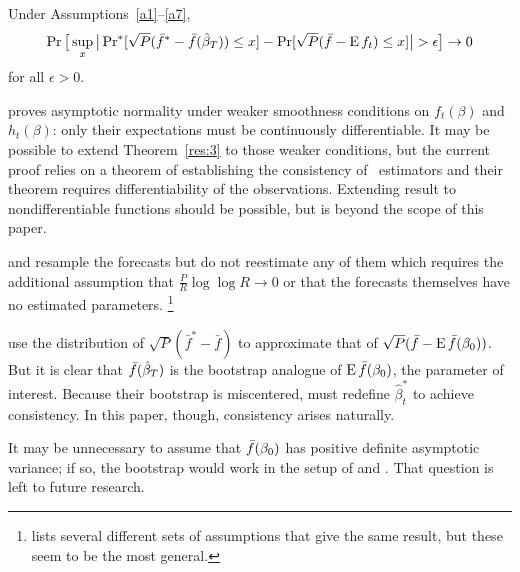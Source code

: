 \documentclass[12pt,fleqn]{article}
\begin{document}
\begin{thm}\label{res:3}
  Under Assumptions~\ref{a1}--\ref{a7},
  \begin{equation}
    \pr\big[\sup_x \big\lvert \pr^*[\sqrt{P} (\bar{f}^* - \bar{f}(\btrue[*])) \leq x]
    - \pr[\sqrt{P}( \bar{f} - \E f_t) \leq x] \big\rvert > \epsilon\big] \to 0
  \end{equation}
  for all $\epsilon > 0$.
\end{thm}

\begin{rem}
  \citet{Mcc:00} proves asymptotic normality under weaker smoothness
  conditions on $f_t(\beta)$ and $h_t(\beta)$: only their expectations
  must be continuously differentiable.  It may be possible to extend
  Theorem~\ref{res:3} to those weaker conditions, but the current
  proof relies on a theorem of  establishing the
  consistency of \hac\ estimators and their theorem requires differentiability of
  the observations.  Extending  result to
  nondifferentiable functions should be possible, but is beyond the
  scope of this paper.
\end{rem}

\begin{rem}
  \citet{Whi:00} and \citet{Han:05} resample the forecasts but do not
  reestimate any of them which requires the additional assumption that
  $\tfrac{P}{R} \log \log R \to 0$ or that the forecasts themselves
  have no estimated parameters.%
\footnote{\citet{Whi:00} lists several
    different sets of assumptions that give the same result, but these
    seem to be the most general.} %
\end{rem}

\begin{rem}
  \citet{CoS:07} use the distribution of $\sqrt{P}(\bar{f}^{*} -
  \bar{f})$ to approximate that of $\sqrt{P}(\bar{f} - \E
  \bar{f}(\btrue))$.  But it is clear that $\bar{f}(\btrue[*])$
  is the bootstrap analogue of $\E \bar{f}(\btrue)$, the parameter of
  interest.  Because their bootstrap is miscentered, \citet{CoS:07}
  must redefine $\hat{\beta}_t^{*}$ to achieve consistency.  In this
  paper, though, consistency arises naturally.
\end{rem}

\begin{rem}
  It may be unnecessary to assume that $\bar{f}(\btrue)$ has positive
  definite asymptotic variance; if so, the bootstrap would work in the
  setup of \citet{ClM:05,ClM:01} and \citet{Mcc:07}.  That question is
  left to future research.
\end{rem}
\end{document}
